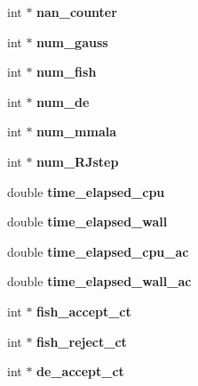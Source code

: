 \begin{DoxyCompactItemize}
int $\ast$ {\bfseries nan\+\_\+counter}
\item 
\mbox{\label{classsampler_a6ce2347be8d2b3e0e67c368bf99adc76}} 
int $\ast$ {\bfseries num\+\_\+gauss}
\item 
\mbox{\label{classsampler_a0b4eca5b517c4602a85cafb66bd3624c}} 
int $\ast$ {\bfseries num\+\_\+fish}
\item 
\mbox{\label{classsampler_a1a26270a568bccef49d20d6ae441c732}} 
int $\ast$ {\bfseries num\+\_\+de}
\item 
\mbox{\label{classsampler_a2bb9259c38eaa9516a021db7c936fdd7}} 
int $\ast$ {\bfseries num\+\_\+mmala}
\item 
\mbox{\label{classsampler_a7b934ed8a7b185ad220cf4e0fa419c40}} 
int $\ast$ {\bfseries num\+\_\+\+R\+Jstep}
\item 
\mbox{\label{classsampler_a50568d956eeb78cc429cfd991f0b9d00}} 
double {\bfseries time\+\_\+elapsed\+\_\+cpu}
\item 
\mbox{\label{classsampler_a124ea1d01f54e4faf9e39881e59adcf9}} 
double {\bfseries time\+\_\+elapsed\+\_\+wall}
\item 
\mbox{\label{classsampler_a04a8f35bde5f14cb1d84ef50c7984957}} 
double {\bfseries time\+\_\+elapsed\+\_\+cpu\+\_\+ac}
\item 
\mbox{\label{classsampler_a34e5def2ae898e19d183a2099f5332e5}} 
double {\bfseries time\+\_\+elapsed\+\_\+wall\+\_\+ac}
\item 
\mbox{\label{classsampler_a30af5faec6c465a22f57326ea1eb03f8}} 
int $\ast$ {\bfseries fish\+\_\+accept\+\_\+ct}
\item 
\mbox{\label{classsampler_a707d291d8badf1dd66f22240097275ba}} 
int $\ast$ {\bfseries fish\+\_\+reject\+\_\+ct}
\item 
\mbox{\label{classsampler_af7b6445ee490352ac482385a217a7e05}} 
int $\ast$ {\bfseries de\+\_\+accept\+\_\+ct}

\end{DoxyCompactItemize}
